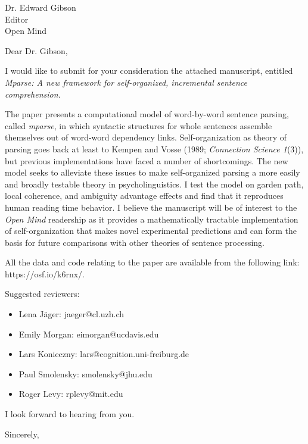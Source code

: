 \documentclass[fontsize=12pt, paper=letter]{scrlttr2}
\begin{document}
\begin{letter}{Dr. Edward Gibson\\
    Editor\\
    Open Mind}

\opening{Dear Dr. Gibson,}

I would like to submit for your consideration the attached manuscript, entitled
\emph{Mparse: A new framework for self-organized, incremental sentence
comprehension}.

The paper presents a computational model of word-by-word sentence parsing,
called \emph{mparse}, in which syntactic structures for whole sentences
assemble themselves out of word-word dependency links. Self-organization as
theory of parsing goes back at least to Kempen and Vosse (1989;
\emph{Connection Science 1}(3)), but previous implementations have faced a
number of shortcomings. The new model seeks to alleviate these issues to
make self-organized parsing a more easily and broadly testable theory in
psycholinguistics. I test the model on garden path, local coherence, and
ambiguity advantage effects and find that it reproduces human reading time
behavior. I believe the manuscript will be of interest to the \emph{Open
Mind} readership as it provides a mathematically tractable implementation
of self-organization that makes novel experimental predictions and can form
the basis for future comparisons with other theories of sentence
processing.

All the data and code relating to the paper are available from the following
link: https://osf.io/k6rnx/.

Suggested reviewers:
\begin{itemize}
\item Lena Jäger: jaeger@cl.uzh.ch
\item Emily Morgan: eimorgan@ucdavis.edu
\item Lars Konieczny: lars@cognition.uni-freiburg.de
\item Paul Smolensky: smolensky@jhu.edu
\item Roger Levy: rplevy@mit.edu
\end{itemize}

I look forward to hearing from you. 

\closing{Sincerely,} %


\end{letter}
\end{document}
